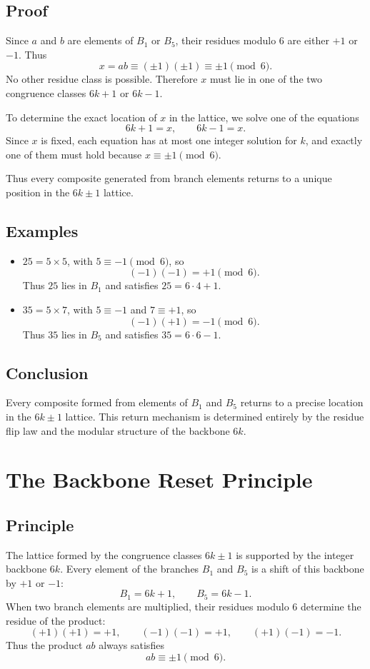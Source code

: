 \documentclass[12pt]{article}
\begin{document}
\subsection*{Proof}
Since $a$ and $b$ are elements of $B_1$ or $B_5$, their residues modulo $6$
are either $+1$ or $-1$. Thus
\[
x = ab \equiv (\pm 1)(\pm 1) \equiv \pm 1 \pmod{6}.
\]
No other residue class is possible. Therefore $x$ must lie in one of the two
congruence classes $6k+1$ or $6k-1$.

To determine the exact location of $x$ in the lattice, we solve one of the
equations
\[
6k+1 = x, \qquad 6k-1 = x.
\]
Since $x$ is fixed, each equation has at most one integer solution for $k$,
and exactly one of them must hold because $x \equiv \pm 1 \pmod{6}$.

Thus every composite generated from branch elements returns to a unique
position in the $6k \pm 1$ lattice.

\subsection*{Examples}
\begin{itemize}
\item $25 = 5 \times 5$, with $5 \equiv -1 \pmod{6}$, so
\[
(-1)(-1) = +1 \pmod{6}.
\]
Thus $25$ lies in $B_1$ and satisfies $25 = 6 \cdot 4 + 1$.

\item $35 = 5 \times 7$, with $5 \equiv -1$ and $7 \equiv +1$, so
\[
(-1)(+1) = -1 \pmod{6}.
\]
Thus $35$ lies in $B_5$ and satisfies $35 = 6 \cdot 6 - 1$.
\end{itemize}

\subsection*{Conclusion}
Every composite formed from elements of $B_1$ and $B_5$ returns to a precise
location in the $6k \pm 1$ lattice. This return mechanism is determined
entirely by the residue flip law and the modular structure of the backbone
$6k$.

\section{The Backbone Reset Principle}

\subsection*{Principle}
The lattice formed by the congruence classes $6k \pm 1$ is supported by the
integer backbone $6k$. Every element of the branches $B_1$ and $B_5$ is a
shift of this backbone by $+1$ or $-1$:
\[
B_1 = 6k+1, \qquad B_5 = 6k-1.
\]
When two branch elements are multiplied, their residues modulo $6$ determine
the residue of the product:
\[
(+1)(+1) = +1, \qquad (-1)(-1) = +1, \qquad (+1)(-1) = -1.
\]
Thus the product $ab$ always satisfies
\[
ab \equiv \pm 1 \pmod{6}.
\]
\end{document}
